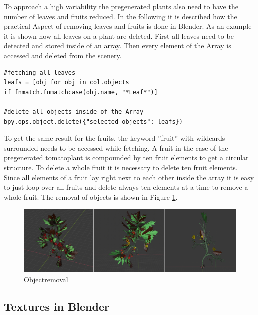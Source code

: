 To approach a high variability the pregenerated plants also need to have the number of leaves and fruits reduced.
In the following it is described how the practical Aspect of removing leaves and fruits is done in Blender.
As an example it is shown how all leaves on a plant are deleted. \newline
First all leaves need to be detected and stored inside of an array. Then every element of the Array is accessed and deleted from the scenery.
\lstset{language=Python, frame=single}
\begin{lstlisting}
#fetching all leaves
leafs = [obj for obj in col.objects
if fnmatch.fnmatchcase(obj.name, "*Leaf*")]

#delete all objects inside of the Array
bpy.ops.object.delete({"selected_objects": leafs})
\end{lstlisting}
To get the same result for the fruits, the keyword ''fruit'' with wildcards surrounded needs to be accessed while fetching. A fruit in the case of the pregenerated tomatoplant is compounded by ten fruit elements to get a circular structure. To delete a whole fruit it is necessary to delete ten fruit elements. Since all elements of a fruit lay right next to each other inside the array it is easy to just loop over all fruits and delete always ten elements at a time to remove a whole fruit.
\newline
The removal of objects is shown in Figure \ref{order}.

\begin{figure}[h]
\centering
\includegraphics[width=1\textwidth]{examples.png}
\caption{Objectremoval}
\label{order}
\end{figure}


\subsection{Textures in Blender}
\label{textures}


